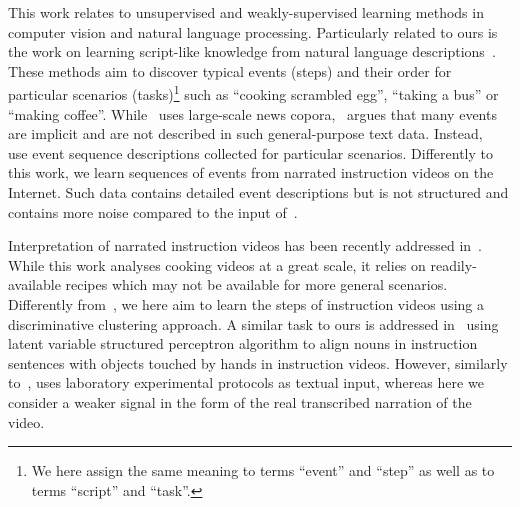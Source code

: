 \documentclass[10pt,twocolumn,letterpaper]{article}
\begin{document}
This work relates to unsupervised and weakly-supervised learning methods in computer vision and natural language processing.
Particularly related to ours is the work on learning script-like knowledge from natural language descriptions~\cite{Chambers08,Frermann14,Regneri10learning}. These methods aim to discover typical events (steps) and their order for particular scenarios (tasks)\footnote{We here assign the same meaning to terms ``event'' and ``step'' as well as to terms ``script'' and ``task''.} such as ``cooking scrambled egg'', ``taking a bus'' or ``making coffee''. While~\cite{Chambers08} uses large-scale news copora,~\cite{Regneri10learning} argues that many events are implicit and are not described in such general-purpose text data. Instead,~\cite{Frermann14,Regneri10learning} use event sequence descriptions collected for particular scenarios. Differently to this work, we learn sequences of events from narrated instruction videos on the Internet. Such data contains detailed event descriptions but is not structured and contains more noise compared to the input of~\cite{Frermann14,Regneri10learning}. 


Interpretation of narrated instruction videos has been recently addressed in~\cite{Malmaud15what}. While this work analyses cooking videos at a great scale, it relies on readily-available recipes which may not be available for more general scenarios. Differently from~\cite{Malmaud15what}, we here aim to learn the steps of instruction videos using a discriminative clustering approach.
A similar task to ours is addressed in~\cite{Naim15discriminative} using latent variable structured perceptron algorithm to align nouns in instruction sentences with objects touched by hands in instruction videos.
However, similarly to~\cite{Malmaud15what}, \cite{Naim15discriminative} uses laboratory experimental protocols as textual input, whereas here we consider a weaker signal in the form of the real transcribed narration of the video.
\end{document}
